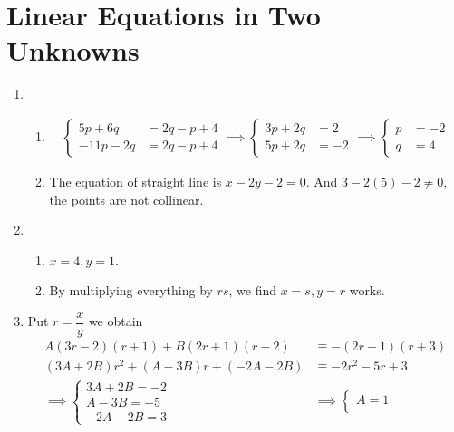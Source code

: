 \documentclass[12pt]{article}
\begin{document}
    \section{Linear Equations in Two Unknowns}
    \begin{enumerate}
        \item \begin{enumerate}
            \item \begin{align*}
                \begin{cases}
                    5p+6q&=2q-p+4\\
                    -11p-2q&=2q-p+4
                \end{cases}\implies\begin{cases}
                    3p+2q&=2\\
                    5p+2q&=-2
                \end{cases}\implies\begin{cases}
                    p&=-2\\
                    q&=4
                \end{cases}
            \end{align*}
            \item The equation of straight line is $x-2y-2=0$. And $3-2(5)-2\neq 0$, the points are not collinear.
        \end{enumerate}
        \item \begin{enumerate}
            \item $x=4, y=1$.
            \item By multiplying everything by $rs$, we find $x=s, y=r$ works.
        \end{enumerate}
        \item Put $r=\dfrac{x}{y}$ we obtain \begin{align*}
            A(3r-2)(r+1)+B(2r+1)(r-2)&\equiv -(2r-1)(r+3)\\
            (3A+2B)r^2+(A-3B)r+(-2A-2B)&\equiv -2r^2-5r+3\\
            \implies\begin{cases}
                3A+2B=-2\\
                A-3B=-5\\
                -2A-2B=3
            \end{cases}&\implies\begin{cases}
                A=1\\

\end{cases}
\end{align*}
\end{enumerate}
\end{document}

